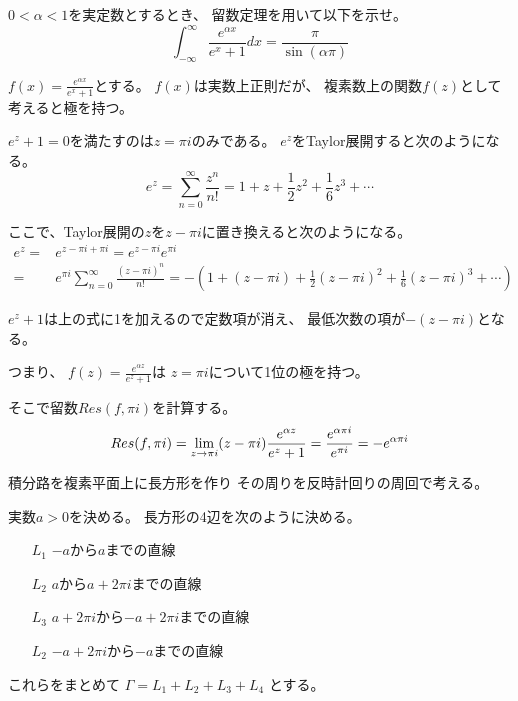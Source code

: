 \documentclass[12pt,b5paper]{ltjsarticle}
\begin{document}
\hrulefill

$0< \alpha < 1$を実定数とするとき、
留数定理を用いて以下を示せ。
\begin{equation}
 \int_{-\infty}^{\infty} \frac{e^{\alpha x}}{e^{x}+1}dx
  = \frac{\pi}{\sin{(\alpha\pi)}}
\end{equation}

\dotfill


$f(x)=\frac{e^{\alpha x}}{e^{x}+1}$とする。
$f(x)$は実数上正則だが、
複素数上の関数$f(z)$として考えると極を持つ。

$e^{z}+1=0$を満たすのは$z=\pi i$のみである。
$e^{z}$をTaylor展開すると次のようになる。
\begin{equation}
 e^{z}=\sum_{n=0}^{\infty}\frac{z^n}{n!}
  = 1 + z + \frac{1}{2}z^{2} + \frac{1}{6}z^{3} + \cdots
\end{equation}

ここで、Taylor展開の$z$を$z-\pi i$に置き換えると次のようになる。
\begin{align}
 e^{z} =& e^{z-\pi i + \pi i}
  = e^{z-\pi i} e^{\pi i}\\
 =& e^{\pi i} \sum_{n=0}^{\infty}\frac{(z-\pi i)^n}{n!}
 = -\left( 1 + (z-\pi i) + \frac{1}{2}(z-\pi i)^{2} + \frac{1}{6}(z-\pi i)^{3} + \cdots \right)
\end{align}

$e^z+1$は上の式に1を加えるので定数項が消え、
最低次数の項が$-(z-\pi i)$となる。

つまり、
$f(z)=\frac{e^{\alpha z}}{e^{z}+1}$は
$z=\pi i$について1位の極を持つ。

そこで留数$Res(f,\pi i)$を計算する。
\begin{equation}
 Res(f,\pi i)
 = \lim_{z\to \pi i}(z-\pi i) \frac{e^{\alpha z}}{e^{z}+1}\\
 = \frac{e^{\alpha \pi i}}{e^{\pi i}}
  = -e^{\alpha \pi i}
  \label{res_value}
\end{equation}

積分路を複素平面上に長方形を作り
その周りを反時計回りの周回で考える。

実数$a > 0$を決める。
長方形の4辺を次のように決める。
\begin{itemize}
 \item [$L_1$]
       $-a$から$a$までの直線
 \item [$L_2$]
       $a$から$a+2\pi i$までの直線
 \item [$L_3$]
       $a+2\pi i$から$-a+2\pi i$までの直線
 \item [$L_2$]
       $-a+2\pi i$から$-a$までの直線
\end{itemize}
これらをまとめて
$\Gamma = L_1 + L_2 + L_3 + L_4$
とする。
\end{document}
